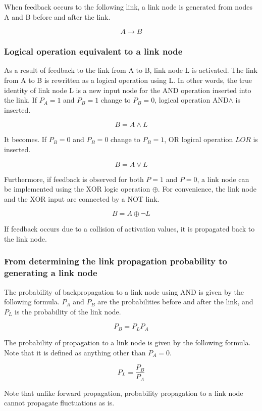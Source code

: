 \documentclass[12pt]{article}
\begin{document}
When feedback occurs to the following link, a link node is generated
from nodes A and B before and after the link.

\[ A \rightarrow B\]

\subsubsection{Logical operation equivalent to a link
node}\label{logical-operation-equivalent-to-a-link-node}

As a result of feedback to the link from A to B, link node L is
activated. The link from A to B is rewritten as a logical operation
using L. In other words, the true identity of link node L is a new input
node for the AND operation inserted into the link. If \(P_A=1\) and
\(P_B=1\) change to \(P_B=0\), logical operation AND\(\land\) is
inserted.

\[ B=A \land L\]

It becomes. If \(P_B=0\) and \(P_B=0\) change to \(P_B=1\), OR logical
operation \(LOR\) is inserted.

\[B=A \lor L\]

Furthermore, if feedback is observed for both \(P=1\) and \(P=0\), a
link node can be implemented using the XOR logic operation \(\oplus\).
For convenience, the link node and the XOR input are connected by a NOT
link.

\[B= A \oplus \neg L\]

If feedback occurs due to a collision of activation values, it is
propagated back to the link node.

\subsubsection{From determining the link propagation probability to
generating a link
node}\label{from-determining-the-link-propagation-probability-to-generating-a-link-node}

The probability of backpropagation to a link node using AND is given by
the following formula. \(P_A\) and \(P_B\) are the probabilities before
and after the link, and \(P_L\) is the probability of the link node.

\[ P_B=P_L P_A\]

The probability of propagation to a link node is given by the following
formula. Note that it is defined as anything other than \(P_A=0\).

\[ P_L=\frac{P_B}{P_A}\]

Note that unlike forward propagation, probability propagation to a link
node cannot propagate fluctuations as is.
\end{document}
